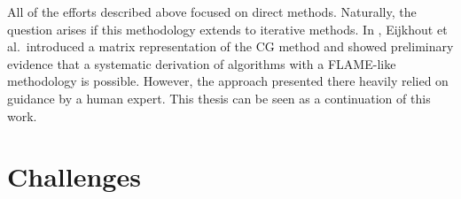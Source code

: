 


%
%
%
%
%
%
%
%

All of the efforts described above focused on direct methods. Naturally, the question arises if this methodology extends to iterative methods. In \cite{eijkhout:CGderivation}, Eijkhout et al.\ introduced a matrix representation of the CG method and showed preliminary evidence that a systematic derivation of algorithms with a FLAME-like methodology is possible. However, the approach presented there heavily relied on guidance by a human expert. This thesis can be seen as a continuation of this work.

\section{Challenges}

